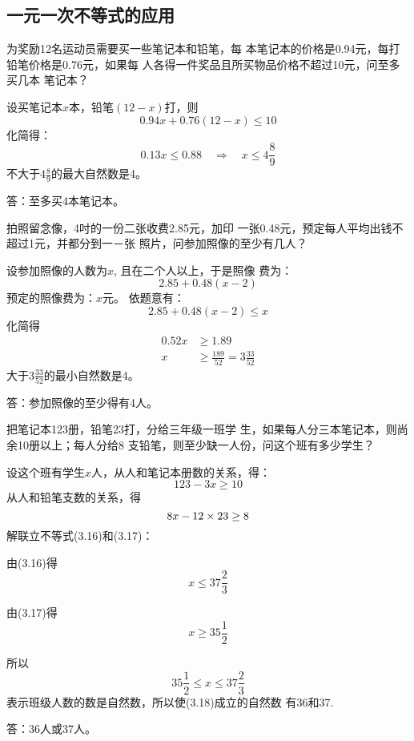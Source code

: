 \subsection{一元一次不等式的应用}

\begin{example}
    为奖励12名运动员需要买一些笔记本和铅笔，每
本笔记本的价格是0.94元，每打铅笔价格是0.76元，如果每
人各得一件奖品且所买物品价格不超过10元，问至多买几本
笔记本？
\end{example}


\begin{solution}
    设买笔记本$x$本，铅笔$(12-x)$打，则
\[0.94x+0.76(12-x)\le 10\]
化简得：
\[0.13x\le 0.88\quad \Rightarrow\quad x\le 4\frac{8}{9}\]
不大于$4\frac{8}{9}$的最大自然数是4。

答：至多买4本笔记本。
\end{solution}
    

    
\begin{example}
    拍照留念像，4吋的一份二张收费2.85元，加印
一张0.48元，预定每人平均出钱不超过1元，并都分到一－张
照片，问参加照像的至少有几人？
\end{example}

\begin{solution}
设参加照像的人数为$x$, 且在二个人以上，于是照像
费为：
\[2.85+0.48(x-2)\]
预定的照像费为：$x$元。
依题意有：
\[2.85+0.48(x-2)\le x\]
化简得
\[\begin{split}
    0.52x&\ge 1.89\\
x&\ge \frac{189}{52}=3\frac{33}{52}
\end{split}\]
大于$3\frac{33}{52}$的最小自然数是4。

答：参加照像的至少得有4人。
\end{solution}
    

\begin{example}
把笔记本123册，铅笔23打，分给三年级一班学
生，如果每人分三本笔记本，则尚余10册以上；每人分给8
支铅笔，则至少缺一人份，问这个班有多少学生？
\end{example}

\begin{solution}
 设这个班有学生$x$人，从人和笔记本册数的关系，得：
 \begin{equation}
     123-3x\ge 10
 \end{equation}
从人和铅笔支数的关系，得
\begin{equation}
    8x-12\times 23\ge 8
\end{equation}
解联立不等式(3.16)和(3.17)：

由(3.16)得
\[x\le 37\frac{2}{3}\]

由(3.17)得
\[x\ge 35\frac{1}{2}\]

所以
\begin{equation}
    35\frac{1}{2}\le x\le 37\frac{2}{3}
\end{equation}
表示班级人数的数是自然数，所以使(3.18)成立的自然数
有36和37.

答：36人或37人。
\end{solution}

